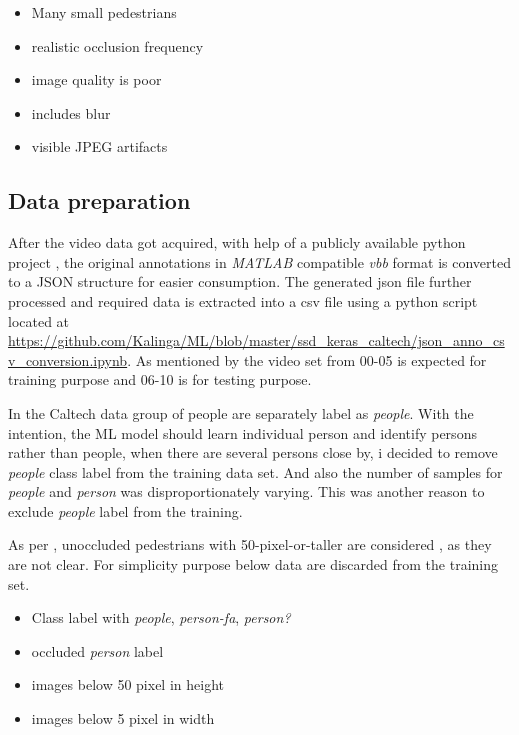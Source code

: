 \begin{itemize}
	\setlength\itemsep{-1em}
	\item Many small pedestrians
	\item realistic occlusion frequency
	\item image quality is poor
	\item includes blur
	\item visible JPEG artifacts
\end{itemize}

\subsection{Data preparation}
After the video data got acquired, with help of a publicly available python project \cite{shuntasaito2015}, the original annotations in \textit{MATLAB} compatible \textit{vbb} format is converted to a JSON structure for easier consumption. The generated json file further processed and required data is extracted into a csv file using a python script located at \url{ https://github.com/Kalinga/ML/blob/master/ssd_keras_caltech/json_anno_csv_conversion.ipynb}. As mentioned by \cite{dollar2009pedestrian} the video set from 00-05 is expected for training purpose and 06-10 is for testing purpose.

In the Caltech data group of people are separately label as \textit{people}. With the intention, the ML model should learn individual person and identify persons rather than people, when there are several persons close by, i decided to remove \textit{people} class label from the training data set. And also the number of samples for \textit{people} and \textit{person} was disproportionately varying. This was another reason to exclude \textit{people }label from  the training. 


As per \cite{walk2010new}, unoccluded pedestrians with 50-pixel-or-taller are considered , as they are not clear. For simplicity purpose below data are discarded from the training set.
\begin{itemize}
	\item Class label with \textit{people}, \textit{person-fa}, \textit{person?}
	\item occluded \textit{person} label
	\item images below 50 pixel in height
	\item images below 5 pixel in width
\end{itemize}


